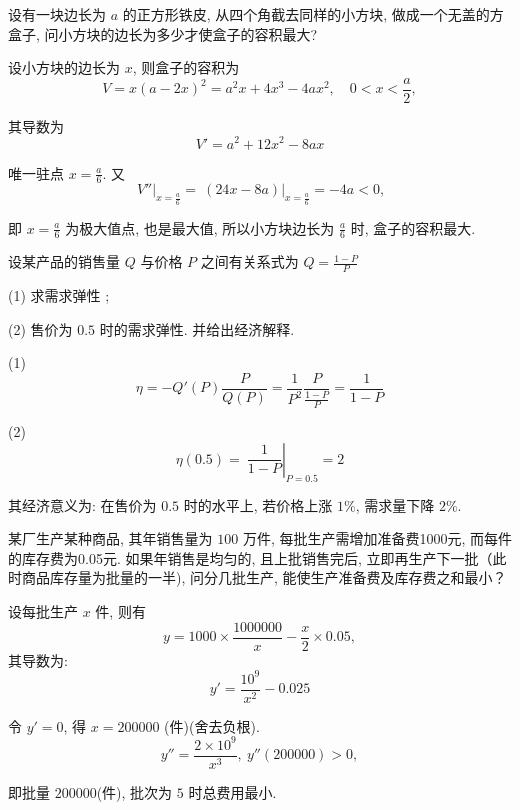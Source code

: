 \begin{problem} 设有一块边长为 $a$ 的正方形铁皮, 从四个角截去同样的小方块,
做成一个无盖的方盒子, 问小方块的边长为多少才使盒子的容积最大?

\begin{solution} 设小方块的边长为 $x$, 则盒子的容积为
$$V = x\left( a - 2x \right)^{2} = a^{2}x + 4x^{3} - 4ax^{2},\quad 0 < x < \frac{a}{2},$$

其导数为
$$V' = a^{2} + 12x^{2} - 8ax$$

唯一驻点 $\displaystyle x = \frac{a}{6}$. 又
$$\left. \ V'' \right|_{x = \frac{a}{6}} = \left. \ \left( 24x - 8a \right) \right|_{x = \frac{a}{6}} = - 4a < 0,$$

即 $\displaystyle x = \frac{a}{6}$ 为极大值点, 也是最大值, 所以小方块边长为
$\displaystyle \frac{a}{6}$ 时, 盒子的容积最大.
\end{solution}

\end{problem}           

\begin{problem} 设某产品的销售量 $Q$ 与价格 $P$ 之间有关系式为
$\displaystyle Q = \frac{1 - P}{P}$

(1) 求需求弹性 ;

(2) 售价为 $0.5$ 时的需求弹性. 并给出经济解释.

\begin{solution}(1)
$$\eta = - Q'\left( P \right)\frac{P}{Q\left( P \right)} = \frac{1}{P^{2}}\frac{P}{\frac{1 - P}{P}} = \frac{1}{1 - P}$$

(2)
$$\eta\left( 0.5 \right) = \left. \ \frac{1}{1 - P} \right|_{P = 0.5} = 2$$

其经济意义为: 在售价为 $0.5$ 时的水平上, 若价格上涨 $1\%$,
需求量下降 $2\%.$
\end{solution}

\end{problem}           

\begin{problem} 某厂生产某种商品, 其年销售量为 $100$ 万件,
每批生产需增加准备费1000元, 而每件的库存费为0.05元. 如果年销售是均匀的,
且上批销售完后, 立即再生产下一批（此时商品库存量为批量的一半),
问分几批生产, 能使生产准备费及库存费之和最小？

\begin{solution} 设每批生产 $x$ 件, 则有
$$y = 1000 \times \frac{1000000}{x} - \frac{x}{2} \times 0.05,$$
其导数为:
$$y' = \frac{10^{9}}{x^{2}} - 0.025$$

令 $y' = 0$, 得 $x = 200000$ (件)(舍去负根).
$$y'' = \frac{2 \times 10^{9}}{x^{3}},\ y''\left( 200000 \right) > 0,$$

即批量 $200000$(件), 批次为 $5$ 时总费用最小.
\end{solution}

\end{problem}           

